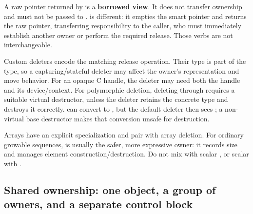 A raw pointer returned by  is a \textbf{borrowed view}. It does not transfer ownership and must not be passed to .  is different: it empties the smart pointer and returns the raw pointer, transferring responsibility to the caller, who must immediately establish another owner or perform the required release. Those verbs are not interchangeable.

Custom deleters encode the matching release operation. Their type is part of the  type, so a capturing/stateful deleter may affect the owner's representation and move behavior. For an opaque C handle, the deleter may need both the handle and its device/context. For polymorphic deletion, deleting  through  requires a suitable virtual destructor, unless the deleter retains the concrete type and destroys it correctly.  can convert to , but the default deleter then sees ; a non-virtual base destructor makes that conversion unsafe for destruction.

Arrays have an explicit  specialization and pair with array deletion. For ordinary growable sequences,  is usually the safer, more expressive owner: it records size and manages element construction/destruction. Do not mix  with scalar , or scalar  with .

\subsection{Shared ownership: one object, a group of owners, and a separate control block}\label{05-engine-i-ch004-shared-ownership-one-object-a-group-of-owners-and-a-separate-control-block}

